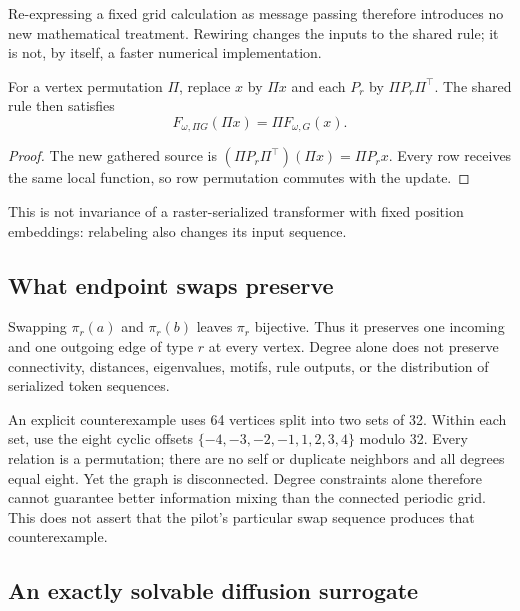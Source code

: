 Re-expressing a fixed grid calculation as message passing therefore
introduces no new mathematical treatment. Rewiring changes the inputs to
the shared rule; it is not, by itself, a faster numerical implementation.

\begin{proposition}
For a vertex permutation $\Pi$, replace $x$ by $\Pi x$ and each $P_r$ by
$\Pi P_r\Pi^\top$. The shared rule then satisfies
\[
 F_{\omega,\Pi G}(\Pi x)=\Pi F_{\omega,G}(x).
\]
\end{proposition}
\begin{proof}
The new gathered source is
$(\Pi P_r\Pi^\top)(\Pi x)=\Pi P_rx$. Every row receives the same local
function, so row permutation commutes with the update.
\end{proof}
This is not invariance of a raster-serialized transformer with fixed
position embeddings: relabeling also changes its input sequence.

\subsection{What endpoint swaps preserve}

Swapping $\pi_r(a)$ and $\pi_r(b)$ leaves $\pi_r$ bijective. Thus it
preserves one incoming and one outgoing edge of type $r$ at every vertex.
Degree alone does not preserve connectivity, distances, eigenvalues,
motifs, rule outputs, or the distribution of serialized token sequences.

An explicit counterexample uses 64 vertices split into two sets of 32.
Within each set, use the eight cyclic offsets
$\{-4,-3,-2,-1,1,2,3,4\}$ modulo 32. Every relation is a permutation;
there are no self or duplicate neighbors and all degrees equal eight.
Yet the graph is disconnected. Degree constraints alone therefore cannot
guarantee better information mixing than the connected periodic grid.
This does not assert that the pilot's particular swap sequence produces
that counterexample.

\subsection{An exactly solvable diffusion surrogate}

